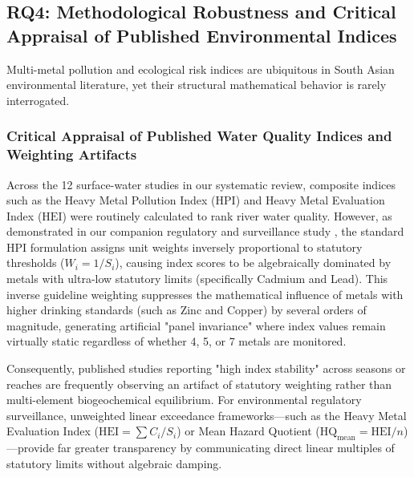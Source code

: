 \documentclass[authoryear,preprint,12pt]{elsarticle}
\begin{document}
\subsection{RQ4: Methodological Robustness and Critical Appraisal of Published Environmental Indices}
Multi-metal pollution and ecological risk indices are ubiquitous in South Asian environmental literature, yet their structural mathematical behavior is rarely interrogated.

\subsubsection{Critical Appraisal of Published Water Quality Indices and Weighting Artifacts}
Across the 12 surface-water studies in our systematic review, composite indices such as the Heavy Metal Pollution Index ($\mathrm{HPI}$) and Heavy Metal Evaluation Index ($\mathrm{HEI}$) were routinely calculated to rank river water quality. However, as demonstrated in our companion regulatory and surveillance study \citep{Mazumder2026Water}, the standard $\mathrm{HPI}$ formulation assigns unit weights inversely proportional to statutory thresholds ($W_i = 1/S_i$), causing index scores to be algebraically dominated by metals with ultra-low statutory limits (specifically Cadmium and Lead). This inverse guideline weighting suppresses the mathematical influence of metals with higher drinking standards (such as Zinc and Copper) by several orders of magnitude, generating artificial "panel invariance" where index values remain virtually static regardless of whether 4, 5, or 7 metals are monitored.

Consequently, published studies reporting "high index stability" across seasons or reaches are frequently observing an artifact of statutory weighting rather than multi-element biogeochemical equilibrium. For environmental regulatory surveillance, unweighted linear exceedance frameworks---such as the Heavy Metal Evaluation Index ($\mathrm{HEI} = \sum C_i/S_i$) or Mean Hazard Quotient ($\mathrm{HQ}_{\mathrm{mean}} = \mathrm{HEI}/n$)---provide far greater transparency by communicating direct linear multiples of statutory limits without algebraic damping.
\end{document}
